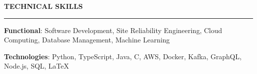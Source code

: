 \documentclass{cv}
\begin{document}

\sectionskip


\textbf{\uppercase{Technical Skills}}
\sectionlineskip
\hrule height 0.6pt
\begin{list}{}{\setlength{\leftmargin}{0pt}}
\itemsep -3.0pt
\item
    \textbf{Functional}: Software Development, Site Reliability Engineering, Cloud Computing, Database Management, Machine Learning
\item
    \textbf{Technologies}: Python, TypeScript, Java, C, AWS, Docker, Kafka, GraphQL, Node.js, SQL, \LaTeX
\end{list}


\sectionskip

\end{document}
